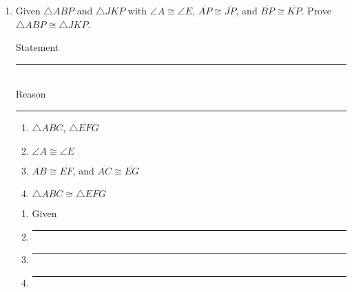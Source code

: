 \documentclass[12pt, oneside]{article}
\begin{document}
\begin{enumerate}
  \item Given $\triangle ABP$ and $\triangle JKP$ with $\angle A \cong \angle E$, $\overline{AP} \cong \overline{JP}$, and $\overline{BP} \cong \overline{KP}$. Prove $\triangle ABP \cong \triangle JKP$.\\[0.5cm]
    \begin{multicols}{2}
      Statement \\ \rule{4cm}{0.15mm}\\
      Reason \\ \rule{4cm}{0.15mm}
    \end{multicols}
    \begin{multicols}{2}
      \begin{enumerate}
        \item $\triangle ABC$, $\triangle EFG$ %
        \item $\angle A \cong \angle E$ %
        \item $\overline{AB} \cong \overline{EF}$, and $\overline{AC} \cong \overline{EG}$ %
        \item $\triangle ABC \cong \triangle EFG$ \\
      \end{enumerate}
      \begin{enumerate}
        \item Given
        \item \rule{4cm}{0.15mm}
        \item \rule{4cm}{0.15mm}
        \item \rule{4cm}{0.15mm}
      \end{enumerate}
    \end{multicols}


\end{enumerate}
\end{document}
